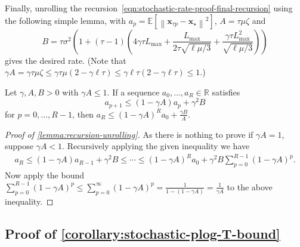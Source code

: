 \documentclass{article}
\newcommand{\vx}{{\mathbf{x}}}
\newcommand{\reals}{\mathbb{R}}
\newcommand{\sqnorm}[1]{\left\| #1 \right\|^2}
\theoremstyle{plain}
\theoremstyle{remark}
\begin{document}
Finally, unrolling the recursion~\eqref{eqn:stochastic-rate-proof-final-recursion} using the following simple lemma, with $a_p = \mathbb{E}\left[ \sqnorm{\vx_{\tau p} - \vx_\star} \right]$, $A = \tau\mu\zeta$ and %
\[
    B = \tau \sigma^2 \left( 1 + (\tau - 1) \left( 4\gamma\tau L_{\mathrm{max}} + \frac{L_{\mathrm{max}}}{2\tau\sqrt{\ell\mu/3}} + \frac{\gamma\tau L_{\mathrm{max}}^2}{\sqrt{\ell\mu/3}} \right) \right)
\]
gives the desired rate.
(Note that $\gamma A = \gamma\tau\mu\zeta \le \gamma\tau\mu (2 - \gamma\ell\tau) \le \gamma\ell\tau (2 - \gamma\ell\tau) \le 1$.)

\begin{lemma}
\label{lemma:recursion-unrolling}
Let $\gamma, A, B > 0$ with $\gamma A \le 1$. If a sequence $a_0, \dots, a_R \in \reals$ satisfies 
\[
    a_{p+1} \le (1-\gamma A) a_p + \gamma^2 B 
\]
for $p=0,\dots,R-1$, then $a_R \le (1-\gamma A)^R a_0 + \frac{\gamma B}{A}$.
\end{lemma}

\begin{proof}[Proof of \cref{lemma:recursion-unrolling}]
As there is nothing to prove if $\gamma A = 1$, suppose $\gamma A < 1$.
Recursively applying the given inequality we have
\begin{align*}
    a_R \le (1-\gamma A) a_{R-1} + \gamma^2 B \le \cdots \le (1-\gamma A)^R a_0 + \gamma^2 B \sum_{p=0}^{R-1} (1-\gamma A)^p .
\end{align*}
Now apply the bound $\sum_{p=0}^{R-1} (1-\gamma A)^p \le \sum_{p=0}^\infty (1-\gamma A)^p = \frac{1}{1 - (1 - \gamma A)} = \frac{1}{\gamma A}$ to the above inequality.
\end{proof}

\subsection{Proof of \cref{corollary:stochastic-plog-T-bound}}
\end{document}
